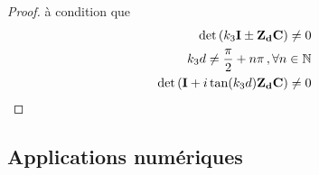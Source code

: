 \begin{proof}
    à condition que 
    \begin{align}
        \det\left(k_3\mathbf{I} \pm \mathbf{Z_d}\mathbf{C} \right) \not = 0 \\
        k_3d\not = \dfrac{\pi}{2}+n\pi\,, \forall n \in \mathbb N \\
        \det\left(\mathbf{I} + i\tan(k_3d)\mathbf{Z_d}\mathbf{C}\right) \not = 0
    \end{align}

\end{proof}

\subsection{Applications numériques}

